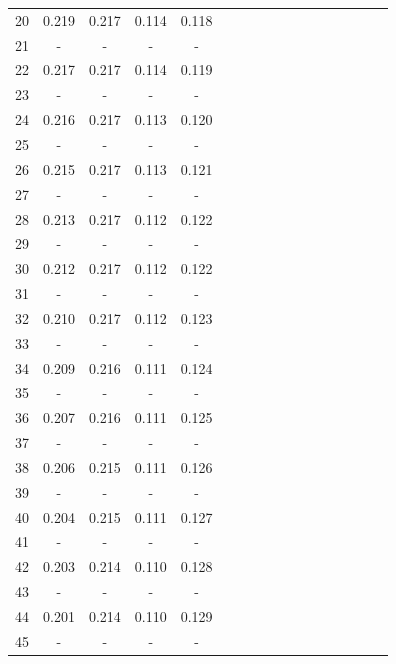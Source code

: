 \documentclass{report}
\begin{document}
\begin{table}
\begin{tabular}{|c|cccc|cccc|cccc|cccc|}
20 & 0.219 & 0.217 & 0.114 & 0.118 & & & & & & & & & & & &\\
21 &   -   &   -   &   -   &   -   & & & & & & & & & & & &\\
22 & 0.217 & 0.217 & 0.114 & 0.119 & & & & & & & & & & & &\\
23 &   -   &   -   &   -   &   -   & & & & & & & & & & & &\\
24 & 0.216 & 0.217 & 0.113 & 0.120 & & & & & & & & & & & &\\
25 &   -   &   -   &   -   &   -   & & & & & & & & & & & &\\
26 & 0.215 & 0.217 & 0.113 & 0.121 & & & & & & & & & & & &\\
27 &   -   &   -   &   -   &   -   & & & & & & & & & & & &\\
28 & 0.213 & 0.217 & 0.112 & 0.122 & & & & & & & & & & & &\\
29 &   -   &   -   &   -   &   -   & & & & & & & & & & & &\\
30 & 0.212 & 0.217 & 0.112 & 0.122 & & & & & & & & & & & &\\
31 &   -   &   -   &   -   &   -   & & & & & & & & & & & &\\
32 & 0.210 & 0.217 & 0.112 & 0.123 & & & & & & & & & & & &\\
33 &   -   &   -   &   -   &   -   & & & & & & & & & & & &\\
34 & 0.209 & 0.216 & 0.111 & 0.124 & & & & & & & & & & & &\\
35 &   -   &   -   &   -   &   -   & & & & & & & & & & & &\\
36 & 0.207 & 0.216 & 0.111 & 0.125 & & & & & & & & & & & &\\
37 &   -   &   -   &   -   &   -   & & & & & & & & & & & &\\
38 & 0.206 & 0.215 & 0.111 & 0.126 & & & & & & & & & & & &\\
39 &   -   &   -   &   -   &   -   & & & & & & & & & & & &\\
40 & 0.204 & 0.215 & 0.111 & 0.127 & & & & & & & & & & & &\\
41 &   -   &   -   &   -   &   -   & & & & & & & & & & & &\\
42 & 0.203 & 0.214 & 0.110 & 0.128 & & & & & & & & & & & &\\
43 &   -   &   -   &   -   &   -   & & & & & & & & & & & &\\
44 & 0.201 & 0.214 & 0.110 & 0.129 & & & & & & & & & & & &\\
45 &   -   &   -   &   -   &   -   & & & & & & & & & & & &\\

\end{tabular}
\end{table}
\end{document}
